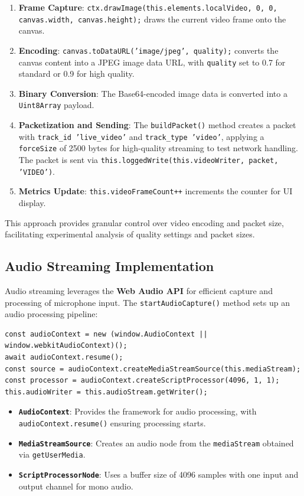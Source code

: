 \begin{enumerate}
    \item \textbf{Frame Capture}: \texttt{ctx.drawImage(this.elements.localVideo, 0, 0, canvas.width\allowbreak{}, canvas.height);} draws the current video frame onto the canvas.
    \item \textbf{Encoding}: \texttt{canvas.toDataURL('image/jpeg', quality);} converts the canvas content into a JPEG image data URL, with \texttt{quality} set to 0.7 for standard or 0.9 for high quality.
    \item \textbf{Binary Conversion}: The Base64-encoded image data is converted into a \texttt{Uint8Array} payload.
    \item \textbf{Packetization and Sending}: The \texttt{buildPacket()} method creates a packet with \texttt{track\_id 'live\_video'} and \texttt{track\_type 'video'}, applying a \texttt{forceSize} of 2500 bytes for high-quality streaming to test network handling. The packet is sent via \texttt{this.loggedWrite(this.videoWriter, packet, 'VIDEO')}.
    \item \textbf{Metrics Update}: \texttt{this.videoFrameCount++} increments the counter for UI display.
\end{enumerate}

This approach provides granular control over video encoding and packet size, facilitating experimental analysis of quality settings and packet sizes.

\subsection{Audio Streaming Implementation}
Audio streaming leverages the \textbf{Web Audio API} for efficient capture and processing of microphone input. The \texttt{startAudioCapture()} method sets up an audio processing pipeline:

\begin{lstlisting}[breaklines=true,basicstyle=\small\ttfamily,frame=single]
const audioContext = new (window.AudioContext || window.webkitAudioContext)();
await audioContext.resume();
const source = audioContext.createMediaStreamSource(this.mediaStream);
const processor = audioContext.createScriptProcessor(4096, 1, 1);
this.audioWriter = this.audioStream.getWriter();
\end{lstlisting}

\begin{itemize}
    \item \textbf{\texttt{AudioContext}}: Provides the framework for audio processing, with \texttt{audioContext.re\allowbreak{}sume()} ensuring processing starts.
    \item \textbf{\texttt{MediaStreamSource}}: Creates an audio node from the \texttt{mediaStream} obtained via \texttt{getUserMedia}.
    \item \textbf{\texttt{ScriptProcessorNode}}: Uses a buffer size of 4096 samples with one input and output channel for mono audio.
\end{itemize}

